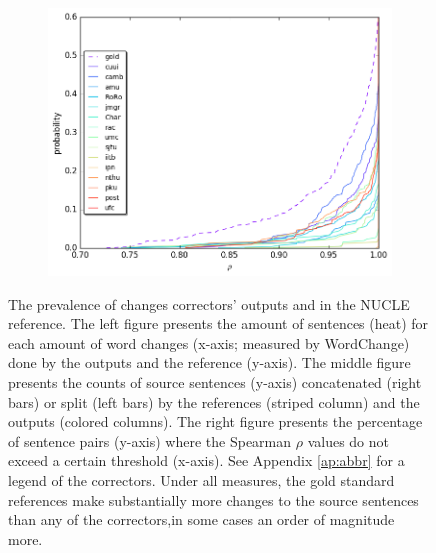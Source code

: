 \documentclass[letterpaper, 11pt]{article}
\begin{document}
\begin{figure}
\begin{subfigure}[]{0.6\columnwidth}
  \end{subfigure}
  \hfill
  \begin{subfigure}[]{0.6\columnwidth}
    \includegraphics[width = \columnwidth]{spearman_ecdf}
  \end{subfigure}
  \caption{\label{fig:over-conservatism}
    The prevalence of changes correctors' outputs and in the NUCLE reference.
    The left figure presents the amount of sentences (heat) for each amount of word changes
    (x-axis; measured by {\sc WordChange}) done by the outputs and the reference (y-axis).
    The middle figure presents the counts of source sentences (y-axis) concatenated (right bars) or split (left bars) by the references (striped column) and the outputs (colored columns).
    The right figure presents the percentage of sentence pairs (y-axis) where the
    Spearman $\rho$ values do not exceed a certain threshold (x-axis).
    See Appendix \ref{ap:abbr} for a legend of the correctors.
    Under all measures, the gold standard references make substantially more changes to the source sentences than any of the correctors,in some cases an order of magnitude more.
  }
\vspace{-0.4cm}
\end{figure}
\end{document}
